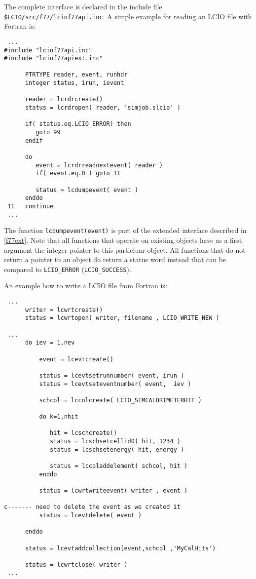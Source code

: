 The complete interface is declared in the include file \verb#$LCIO/src/f77/lciof77api.inc#. 
A simple example for reading an LCIO file with Fortran is:

\begin{verbatim}
 ...
#include "lciof77api.inc"
#include "lciof77apiext.inc"

      PTRTYPE reader, event, runhdr
      integer status, irun, ievent

      reader = lcrdrcreate()
      status = lcrdropen( reader, 'simjob.slcio' )
      
      if( status.eq.LCIO_ERROR) then
         goto 99
      endif

      do 
         event = lcrdrreadnextevent( reader )
         if( event.eq.0 ) goto 11 
         
         status = lcdumpevent( event )
      enddo
 11   continue
 ...
\end{verbatim}
The function \verb$lcdumpevent(event)$ is part of the extended interface described in \ref{f77ext}.
Note that all functions that operate on existing objects have as a first argument the integer pointer 
to this particluar object.
All functions that do not return a pointer to an object do return a status word instead that can be 
compared to \verb$LCIO_ERROR$ (\verb$LCIO_SUCCESS$).

An example how to write a LCIO file from Fortran is:

\begin{verbatim}
 ...
      writer = lcwrtcreate()
      status = lcwrtopen( writer, filename , LCIO_WRITE_NEW )

 ... 
      do iev = 1,nev
          
          event = lcevtcreate()

          status = lcevtsetrunnumber( event, irun ) 
          status = lcevtseteventnumber( event,  iev ) 
 
          schcol = lccolcreate( LCIO_SIMCALORIMETERHIT )

          do k=1,nhit

             hit = lcschcreate() 
             status = lcschsetcellid0( hit, 1234 ) 
             status = lcschsetenergy( hit, energy )

             status = lccoladdelement( schcol, hit ) 
          enddo

          status = lcwrtwriteevent( writer , event )
          
c------- need to delete the event as we created it
          status = lcevtdelete( event )

      enddo

      status = lcevtaddcollection(event,schcol ,'MyCalHits') 

      status = lcwrtclose( writer ) 
 ...
\end{verbatim}

